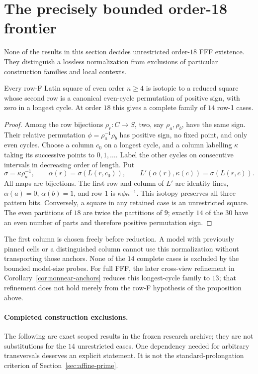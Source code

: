 \section{The precisely bounded order-18 frontier}
\label{sec:order18-scope}

None of the results in this section decides unrestricted order-$18$
FFF existence. They distinguish a lossless normalization from
exclusions of particular construction families and local contexts.

\begin{proposition}
\label{prop:same-sign-normalization}
Every row-F Latin square of even order $n\geq4$ is isotopic to a
reduced square whose second row is a canonical even-cycle
permutation of positive sign, with zero in a longest cycle.
At order $18$ this gives a complete family of $14$ row-1 cases.
\end{proposition}

\begin{proof}
Among the row bijections $\rho_r:C\to S$, two, say $\rho_a,\rho_b$,
have the same sign. Their relative permutation
$\phi=\rho_a^{-1}\rho_b$ has positive sign, no fixed point,
and only even cycles. Choose a column $c_0$ on a longest cycle,
and a column labelling $\kappa$ taking its successive points to
$0,1,\ldots$. Label the other cycles on consecutive intervals
in decreasing order of length. Put
\[
 \sigma=\kappa\rho_a^{-1},\qquad
 \alpha(r)=\sigma(L(r,c_0)),\qquad
 L'(\alpha(r),\kappa(c))=\sigma(L(r,c)).
\]
All maps are bijections. The first row and column of $L'$ are
identity lines, $\alpha(a)=0$, $\alpha(b)=1$, and row 1 is
$\kappa\phi\kappa^{-1}$. This isotopy preserves all three pattern
bits. Conversely, a square in any retained case is an unrestricted
square. The even partitions of $18$ are twice the partitions of
$9$; exactly $14$ of the $30$ have an even number of parts and
therefore positive permutation sign.
\end{proof}

The first column is chosen freely before reduction. A model with
previously pinned cells or a distinguished column cannot use this
normalization without transporting those anchors. None of the
$14$ complete cases is excluded by the bounded model-size probes.
For full FFF, the later cross-view refinement in
Corollary~\ref{cor:nonnear-anchors} reduces this longest-cycle family
to $13$; that refinement does not hold merely from the row-F hypothesis
of the proposition above.

\paragraph{Completed construction exclusions.}
The following are exact scoped results in the frozen research
archive; they are not substitutions for the $14$ unrestricted cases.
One dependency needed for arbitrary transversals deserves an explicit
statement. It is not the standard-prolongation criterion of
Section~\ref{sec:affine-prime}.

